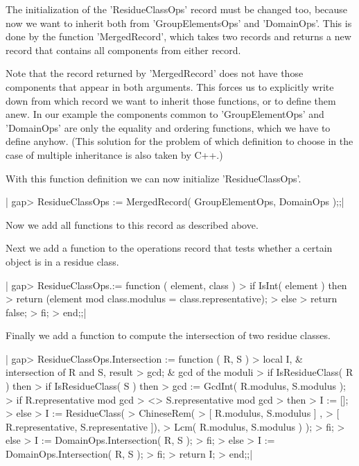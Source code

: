 The  initialization of the  'ResidueClassOps' record must be changed too,
because now   we  want  to   inherit  both  from  'GroupElementsOps'  and
'DomainOps'.  This is  done by the function 'MergedRecord',  which  takes
two records and  returns a new record  that contains all components  from
either record.

Note  that the  record returned  by  'MergedRecord' does not  have  those
components that appear in both arguments.  This forces  us  to explicitly
write down from which  record we  want to inherit those functions, or  to
define   them   anew.    In  our  example   the   components   common  to
'GroupElementOps'  and 'DomainOps' are  only  the  equality and  ordering
functions, which  we  have  to  define  anyhow.   (This  solution for the
problem of which definition to choose in the case of multiple inheritance
is also taken by C++.)

With this function definition we can now initialize 'ResidueClassOps'.

|    gap> ResidueClassOps := MergedRecord( GroupElementOps, DomainOps );;|

Now we add all functions to this record as described above.

Next  we add a  function  to the operations record  that tests  whether a
certain object is in a residue class.

|    gap> ResidueClassOps.\in := function ( element, class )
    >     if IsInt( element )  then
    >         return (element mod class.modulus = class.representative);
    >     else
    >         return false;
    >     fi;
    > end;;|

Finally we add   a function to  compute  the intersection of two  residue
classes.

|    gap> ResidueClassOps.Intersection := function ( R, S )
    >     local   I,          & intersection of R and S, result
    >             gcd;        & gcd of the moduli
    >     if IsResidueClass( R )  then
    >         if IsResidueClass( S )  then
    >             gcd := GcdInt( R.modulus, S.modulus );
    >             if     R.representative mod gcd
    >                 <> S.representative mod gcd
    >             then
    >                 I := [];
    >             else
    >                 I := ResidueClass(
    >                         ChineseRem(
    >                             [ R.modulus,        S.modulus ] ,
    >                             [ R.representative, S.representative ]),
    >                         Lcm(  R.modulus,        S.modulus ) );
    >             fi;
    >         else
    >             I := DomainOps.Intersection( R, S );
    >         fi;
    >     else
    >         I := DomainOps.Intersection( R, S );
    >     fi;
    >     return I;
    > end;;|

